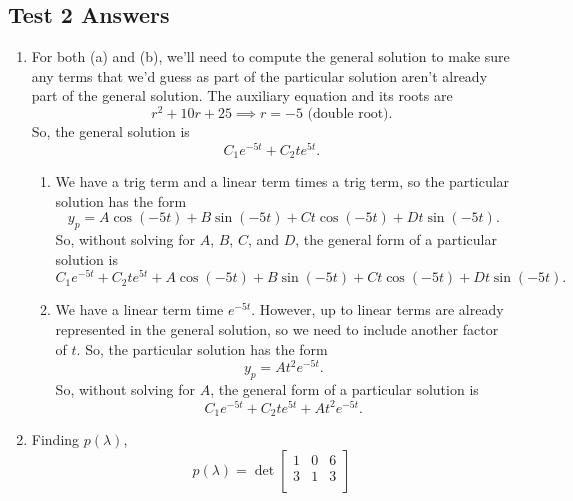 \subsection{Test 2 Answers}
\begin{enumerate}[label=\arabic*.]
	\item
		For both (a) and (b), we'll need to compute the general solution to make sure any terms that we'd guess as part of the particular solution aren't already part of the general solution.
		The auxiliary equation and its roots are
		\begin{equation*}
			r^2 + 10r + 25 \implies r = -5 \text{ (double root)}.
		\end{equation*}
		So, the general solution is
		\begin{equation*}
			C_1e^{-5t} + C_2te^{5t}.
		\end{equation*}
		\begin{enumerate}[label=(\alph*)]
			\item
				We have a trig term and a linear term times a trig term, so the particular solution has the form
				\begin{equation*}
					y_p = A\cos{(-5t)} + B\sin{(-5t)} + Ct\cos{(-5t)} + Dt\sin{(-5t)}.
				\end{equation*}
				So, without solving for $A$, $B$, $C$, and $D$, the general form of a particular solution is
				\begin{equation*}
					C_1e^{-5t} + C_2te^{5t} + A\cos{(-5t)} + B\sin{(-5t)} + Ct\cos{(-5t)} + Dt\sin{(-5t)}.
				\end{equation*}
			\item
				We have a linear term time $e^{-5t}$.
				However, up to linear terms are already represented in the general solution, so we need to include another factor of $t$.
				So, the particular solution has the form
				\begin{equation*}
					y_p = At^2e^{-5t}.
				\end{equation*}
				So, without solving for $A$, the general form of a particular solution is
				\begin{equation*}
					C_1e^{-5t} + C_2te^{5t} + At^2e^{-5t}.
				\end{equation*}
		\end{enumerate}
	\item
		Finding $p(\lambda)$,
		\begin{equation*}
			p(\lambda) = \det\begin{bmatrix}
				1 & 0 & 6 \\
				3 & 1 & 3 \\

\end{bmatrix}
\end{equation*}
\end{enumerate}
